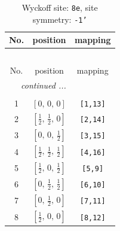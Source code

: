 \documentclass[fleqn,8pt]{jsarticle}
\begin{document}
\renewcommand{\arraystretch}{1.2}
\begin{longtable}{ccc}
\caption{Wyckoff site: {\tt 8e}, site symmetry: {\tt -1'}}
 \\
 \hline \hline
No. & position & mapping \\ \hline \endfirsthead

\multicolumn{2}{l}{\tablename\ \thetable{}} \\
 \hline \hline
No. & position & mapping \\ \hline \endhead

 \hline \hline
\multicolumn{2}{r}{\footnotesize\it continued ...} \\ \endfoot

 \hline \hline
\multicolumn{2}{r}{} \\ \endlastfoot

1 & $\left[ 0,\, 0,\, 0 \right]$ & {\tt [1,13]} \\ \hline
2 & $\left[ \frac{1}{2},\, \frac{1}{2},\, 0 \right]$ & {\tt [2,14]} \\ \hline
3 & $\left[ 0,\, 0,\, \frac{1}{2} \right]$ & {\tt [3,15]} \\ \hline
4 & $\left[ \frac{1}{2},\, \frac{1}{2},\, \frac{1}{2} \right]$ & {\tt [4,16]} \\ \hline
5 & $\left[ \frac{1}{2},\, 0,\, \frac{1}{2} \right]$ & {\tt [5,9]} \\ \hline
6 & $\left[ 0,\, \frac{1}{2},\, \frac{1}{2} \right]$ & {\tt [6,10]} \\ \hline
7 & $\left[ 0,\, \frac{1}{2},\, 0 \right]$ & {\tt [7,11]} \\ \hline
8 & $\left[ \frac{1}{2},\, 0,\, 0 \right]$ & {\tt [8,12]} \\
\end{longtable}
\renewcommand{\arraystretch}{1.2}
\end{document}
